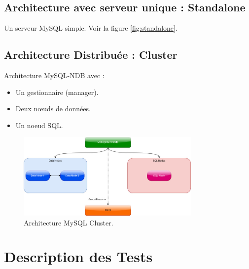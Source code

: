 \documentclass[12pt,a4paper]{report}
\begin{document}
    \subsection{Architecture avec serveur unique : Standalone}

        Un serveur MySQL simple.
        Voir la figure \ref{fig:standalone}.

    \subsection{Architecture Distribuée : Cluster}

        Architecture MySQL-NDB avec :
        \begin{itemize}
            \item Un gestionnaire (manager).
            \item Deux nœuds de données.
            \item Un noeud SQL.
        \end{itemize}

        \begin{figure}[H]
            \centering
            \includegraphics[width=0.8\textwidth]{architectures/MySQLCluster.jpg}
            \caption{Architecture MySQL Cluster.}
            \label{fig:mysql-cluster}
        \end{figure}


\section{Description des Tests}
\end{document}
